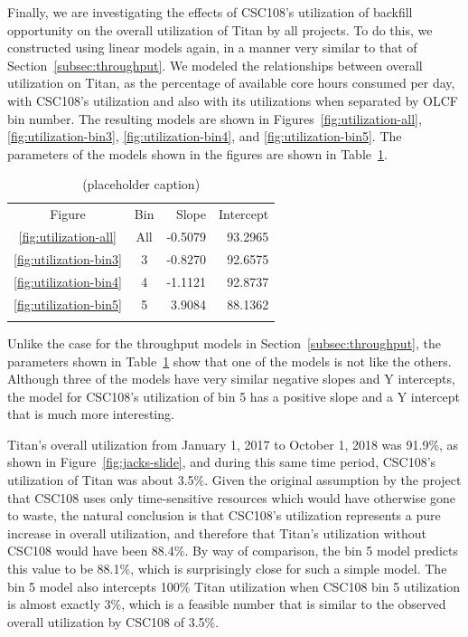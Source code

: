 Finally, we are investigating the effects of CSC108's utilization of backfill
opportunity on the overall utilization of Titan by all projects. To do this, we
constructed using linear models again, in a manner very similar to that of
Section~\ref{subsec:throughput}. We modeled the relationships between overall
utilization on Titan, as the percentage of available core hours consumed per
day, with CSC108's utilization and also with its utilizations when separated by
OLCF bin number. The resulting models are shown in
Figures~\ref{fig:utilization-all}, \ref{fig:utilization-bin3},
\ref{fig:utilization-bin4}, and \ref{fig:utilization-bin5}. The parameters of
the models shown in the figures are shown in
Table~\ref{tab:utilization-params}.

\begin{table}
\caption{(placeholder caption)}
\label{tab:utilization-params}       %
\begin{tabular}{ccrr}
\hline\noalign{\smallskip}
Figure  &   Bin & Slope   & Intercept   \\
\noalign{\smallskip}\hline\noalign{\smallskip}
\ref{fig:utilization-all}    &   All &  -0.5079 &   93.2965 \\
\ref{fig:utilization-bin3}   &   3   &  -0.8270 &   92.6575 \\
\ref{fig:utilization-bin4}   &   4   &  -1.1121 &   92.8737 \\
\ref{fig:utilization-bin5}   &   5   &  3.9084  &   88.1362 \\
\noalign{\smallskip}\hline
\end{tabular}
\end{table}

Unlike the case for the throughput models in Section~\ref{subsec:throughput},
the parameters shown in Table~\ref{tab:utilization-params} show that one of the
models is not like the others. Although three of the models have very similar
negative slopes and Y intercepts, the model for CSC108's utilization of bin 5
has a positive slope and a Y intercept that is much more interesting.

Titan's overall utilization from January 1, 2017 to October 1, 2018 was
91.9\%, as shown in Figure~\ref{fig:jacks-slide}, and during this same time
period, CSC108's utilization of Titan was about 3.5\%. Given the original
assumption by the project that CSC108 uses only time-sensitive resources which
would have otherwise gone to waste, the natural conclusion is that CSC108's
utilization represents a pure increase in overall utilization, and therefore
that Titan's utilization without CSC108 would have been 88.4\%. By way of
comparison, the bin 5 model predicts this value to be 88.1\%, which is
surprisingly close for such a simple model. The bin 5 model also intercepts
100\% Titan utilization when CSC108 bin 5 utilization is almost exactly 3\%,
which is a feasible number that is similar to the observed overall utilization
by CSC108 of 3.5\%.

